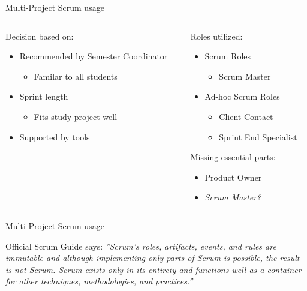 \begin{frame}{Multi-Project Scrum usage}
  \begin{columns}
  		\begin{column}{0.5\textwidth}
  			Decision based on:
  			\begin{itemize}
      		\item Recommended by Semester Coordinator
        		\begin{itemize}
        		\item Familar to all students
        		\end{itemize}
      		\item Sprint length
        		\begin{itemize}
        		\item Fits study project well
        		\end{itemize}
      		\item Supported by tools
        \end{itemize}
  		\end{column}
  		
  		\pause
  		
  		\begin{column}{0.5\textwidth}
        Roles utilized:	
  	    \begin{itemize}
      	  \item Scrum Roles
        	  \begin{itemize}
        	    \item Scrum Master
        	  \end{itemize}
      		\item Ad-hoc Scrum Roles
        		\begin{itemize}
  	      		\item Client Contact
  	      		\item Sprint End Specialist
        		\end{itemize}
      	\end{itemize}
      	\pause
  	    \linespace
  			Missing essential parts:
    				\begin{itemize}
    				\item Product Owner
    				\pause
    				\item \textit{Scrum Master?}
    				\end{itemize}
  		\end{column}
  \end{columns}
\end{frame}

\begin{frame}{Multi-Project Scrum usage}
  \begin{block}{Official Scrum Guide says:}
  \textit{''Scrum’s roles, artifacts, events, and rules are immutable and although implementing only parts of Scrum is possible, the result is not Scrum. 
  Scrum exists only in its entirety and functions well as a container for other techniques, methodologies, and practices.''}
  \end{block}
\end{frame}

